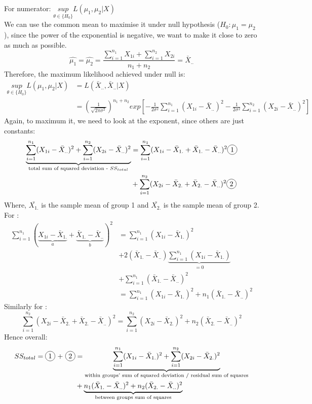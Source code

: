 \documentclass[12pt ]{article}
\newcommand*\circled[1]{\tikz[baseline=(char.base)]{
            \node[shape=circle,draw,inner sep=2pt] (char) {#1};}}
\begin{document}
For numerator: $\underset{\theta \in \{H_{0}\}}{sup} L(\mu_{1}, \mu_{2} | X)$ \\
We can use the common mean to maximise it under null hypothesis ($H_{0}: \mu_{1} = \mu_{2}$), since the power of the exponential is negative, we want to make it close to zero as much as possible.
\begin{equation*}
\hat{\mu_{1}} = \hat{\mu_{2}} = \frac{\sum_{i=1}^{n_{1}} X_{1i} + \sum_{i=1}^{n_{2}} X_{2i}}{n_{1}+n_{2}} = \bar{X}_{..}
\end{equation*}
Therefore, the maximum likelihood achieved under null is:
\begin{align*}
\underset{\theta \in \{H_{0}\}}{sup} L(\mu_{1}, \mu_{2} | X) &= L(\bar{X}_{..}, \bar{X}_{..}|X) \\
&= (\frac{1}{\sqrt{2 \pi \sigma^2}})^{n_{1}+n_{2}} exp[-\frac{1}{2\sigma^2} \sum_{i=1}^{n_{1}} (X_{1i} - \bar{X}_{..})^2 -\frac{1}{2\sigma^2} \sum_{i=1}^{n_{2}} (X_{2i} - \bar{X}_{..})^2]
\end{align*}
Again, to maximum it, we need to look at the exponent, since others are just constants:
\begin{align*}
\underbrace{\sum_{i=1}^{n_{1}} (X_{1i} - \bar{X}_{..})^2 + \sum_{i=1}^{n_{2}} (X_{2i} - \bar{X}_{..})^2}_{\text{total sum of squared deviation - $SS_{total}$}}
&= \sum_{i=1}^{n_{1}} (X_{1i} - \bar{X}_{1.} + \bar{X}_{1.} - \bar{X}_{..})^2 \text{\circled{1}} \\
&+ \sum_{i=1}^{n_{2}} (X_{2i} - \bar{X}_{2.} + \bar{X}_{2.} - \bar{X}_{..})^2 \text{\circled{2}}
\end{align*}
Where, $\bar{X_{1.}}$ is the sample mean of group 1 and $\bar{X_{2.}}$ is the sample mean of group 2. \\
For \circled{1}:
\begin{align*}
\sum_{i=1}^{n_{1}} (\underbrace{X_{1i} - \bar{X}_{1.}}_{a} + \underbrace{\bar{X}_{1.} - \bar{X}_{..}}_{b})^2 &= \sum_{i=1}^{n_{1}} (X_{1i} - \bar{X}_{1.})^2 \\
&+ 2 (\bar{X}_{1.} - \bar{X}_{..})\underbrace{\sum_{i=1}^{n_{1}} (X_{1i} - \bar{X}_{1.})}_{=0} \\
&+ \sum_{i=1}^{n_{1}} (\bar{X}_{1.} - \bar{X}_{..})^2 \\
&= \sum_{i=1}^{n_{1}} (X_{1i} - \bar{X}_{1.})^2 + n_{1}(\bar{X}_{1.} - \bar{X}_{..})^2
\end{align*}
Similarly for \circled{2}:
\begin{equation*}
\sum_{i=1}^{n_{2}} (X_{2i} - \bar{X}_{2.} + \bar{X}_{2.} - \bar{X}_{..})^2 = \sum_{i=1}^{n_{2}} (X_{2i} - \bar{X}_{2.})^2 + n_{2}(\bar{X}_{2.} - \bar{X}_{..})^2
\end{equation*}
Hence overall:
\begin{align*}
SS_{total} = \text{\circled{1} + \circled{2}} &= \underbrace{\sum_{i=1}^{n_{1}} (X_{1i} - \bar{X}_{1.})^2 + \sum_{i=1}^{n_{2}} (X_{2i} - \bar{X}_{2.})^2}_{\text{within groups' sum of squared deviation / residual sum of squares}} \\
&+\underbrace{ n_{1}(\bar{X}_{1.} - \bar{X}_{..})^2 + n_{2}(\bar{X}_{2.} - \bar{X}_{..})^2}_{\text{between groups sum of squares}}
\end{align*} \\
\end{document}

